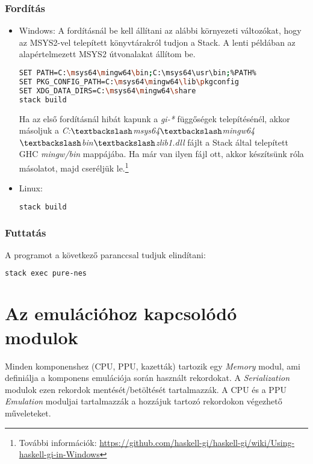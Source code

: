 \subsubsection{Fordítás}
\begin{itemize}
	\item Windows: A fordításnál be kell állítani az alábbi környezeti változókat, hogy 
	az MSYS2-vel telepített könyvtárakról tudjon a Stack. A lenti példában az alapértelmezett MSYS2 útvonalakat állítom be.
\begin{lstlisting}[language=bash]
SET PATH=C:\msys64\mingw64\bin;C:\msys64\usr\bin;%PATH%
SET PKG_CONFIG_PATH=C:\msys64\mingw64\lib\pkgconfig
SET XDG_DATA_DIRS=C:\msys64\mingw64\share
stack build
\end{lstlisting}
	Ha az első fordításnál hibát kapunk a \emph{gi-*} függőségek telepítésénél, akkor másoljuk a 
	\emph{C:$\textbackslash$msys64$\textbackslash$mingw64$\textbackslash$bin$\textbackslash$zlib1.dll} fájlt a Stack által telepített GHC \emph{mingw/bin} mappájába. Ha már van ilyen fájl ott, akkor készítsünk róla másolatot, majd cseréljük le.\footnote{További információk: \url{https://github.com/haskell-gi/haskell-gi/wiki/Using-haskell-gi-in-Windows}}

	\item Linux:
\begin{lstlisting}[language=bash]
stack build
\end{lstlisting}
\end{itemize}

\subsubsection{Futtatás}
A programot a következő paranccsal tudjuk elindítani:
\begin{lstlisting}[language=bash]
stack exec pure-nes
\end{lstlisting}

\section{Az emulációhoz kapcsolódó modulok}

Minden komponenshez (CPU, PPU, kazetták) tartozik egy \emph{Memory} modul, ami definiálja a komponens emulációja során használt rekordokat. A \emph{Serialization} modulok ezen rekordok mentését/betöltését tartalmazzák. A CPU és a PPU \emph{Emulation} moduljai tartalmazzák a hozzájuk tartozó rekordokon végezhető műveleteket.

